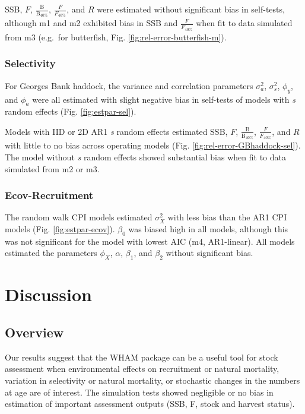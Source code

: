 \documentclass[]{article}
\begin{document}
SSB, \(F\), \(\frac{\text{B}}{\text{B}_{40\%}}\),
\(\frac{F}{F_{40\%}}\), and \(R\) were estimated without significant
bias in self-tests, although m1 and m2 exhibited bias in SSB and
\(\frac{F}{F_{40\%}}\) when fit to data simulated from m3 (e.g.~for
butterfish, Fig. \ref{fig:rel-error-butterfish-m}).

\hypertarget{selectivity}{%
\subsubsection{Selectivity}\label{selectivity}}

For Georges Bank haddock, the variance and correlation parameters
\(\sigma^2_a\), \(\sigma^2_s\), \(\phi_y\), and \(\phi_a\) were all
estimated with slight negative bias in self-tests of models with
\emph{s} random effects (Fig. \ref{fig:estpar-sel}).

Models with IID or 2D AR1 \emph{s} random effects estimated SSB, \(F\),
\(\frac{\text{B}}{\text{B}_{40\%}}\), \(\frac{F}{F_{40\%}}\), and \(R\)
with little to no bias across operating models (Fig.
\ref{fig:rel-error-GBhaddock-sel}). The model without \emph{s} random
effects showed substantial bias when fit to data simulated from m2 or
m3.

\hypertarget{ecov-recruitment}{%
\subsubsection{Ecov-Recruitment}\label{ecov-recruitment}}

The random walk CPI models estimated \(\sigma^2_X\) with less bias than
the AR1 CPI models (Fig. \ref{fig:estpar-ecov}). \(\beta_0\) was biased
high in all models, although this was not significant for the model with
lowest AIC (m4, AR1-linear). All models estimated the parameters
\(\phi_X\), \(\alpha\), \(\beta_1\), and \(\beta_2\) without significant
bias.

\hypertarget{discussion}{%
\section{Discussion}\label{discussion}}

\hypertarget{overview}{%
\subsection{Overview}\label{overview}}

Our results suggest that the WHAM package can be a useful tool for stock
assessment when environmental effects on recruitment or natural
mortality, variation in selectivity or natural mortality, or stochastic
changes in the numbers at age are of interest. The simulation tests
showed negligible or no bias in estimation of important assessment
outputs (SSB, F, stock and harvest status).
\end{document}
